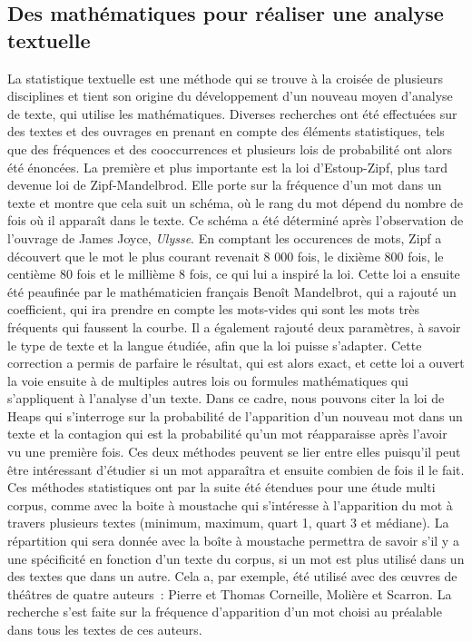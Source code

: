 \subsection{Des mathématiques pour réaliser une analyse textuelle}
La statistique textuelle est une méthode qui se trouve à la croisée de plusieurs disciplines et tient son origine du développement d'un nouveau moyen d'analyse de texte, qui utilise les mathématiques. Diverses recherches ont été effectuées sur des textes et des ouvrages en prenant en compte des éléments statistiques, tels que des fréquences et des cooccurrences et plusieurs lois de probabilité ont alors été énoncées. La première et plus importante est la loi d'Estoup-Zipf, plus tard devenue loi de Zipf-Mandelbrod. Elle porte sur la fréquence d'un mot dans un texte et montre que cela suit un schéma, où le rang du mot dépend du nombre de fois où il apparaît dans le texte. Ce schéma a été déterminé après l'observation de l'ouvrage de James Joyce, \emph{Ulysse}. En comptant les occurences de mots, Zipf a découvert que le mot le plus courant revenait 8 000 fois, le dixième 800 fois, le centième 80 fois et le millième 8 fois, ce qui lui a inspiré la loi. Cette loi a ensuite été peaufinée par le mathématicien français Benoît Mandelbrot, qui a rajouté un coefficient, qui ira prendre en compte les mots-vides qui sont les mots très fréquents qui faussent la courbe. Il a également rajouté deux paramètres, à savoir le type de texte et la langue étudiée, afin que la loi puisse s'adapter. Cette correction a permis de parfaire le résultat, qui est alors exact, et cette loi a ouvert la voie ensuite à de multiples autres lois ou formules mathématiques qui s'appliquent à l'analyse d'un texte. Dans ce cadre, nous pouvons citer la loi de Heaps qui s'interroge sur la probabilité de l'apparition d'un nouveau mot dans un texte et la contagion qui est la probabilité qu'un mot réapparaisse après l'avoir vu une première fois. Ces deux méthodes peuvent se lier entre elles puisqu'il peut être intéressant d'étudier si un mot apparaîtra et ensuite combien de fois il le fait. Ces méthodes statistiques ont par la suite été étendues pour une étude multi corpus, comme avec la boite à moustache qui s'intéresse à l'apparition du mot à travers plusieurs textes (minimum, maximum, quart 1, quart 3 et médiane). La répartition qui sera donnée avec la boîte à moustache permettra de savoir s'il y a une spécificité en fonction d'un texte du corpus, si un mot est plus utilisé dans un des textes que dans un autre. Cela a, par exemple, été utilisé avec des \oe uvres de théâtres de quatre auteurs~: Pierre et Thomas Corneille, Molière et Scarron. La recherche s'est faite sur la fréquence d'apparition d'un mot choisi au préalable dans tous les textes de ces auteurs.

